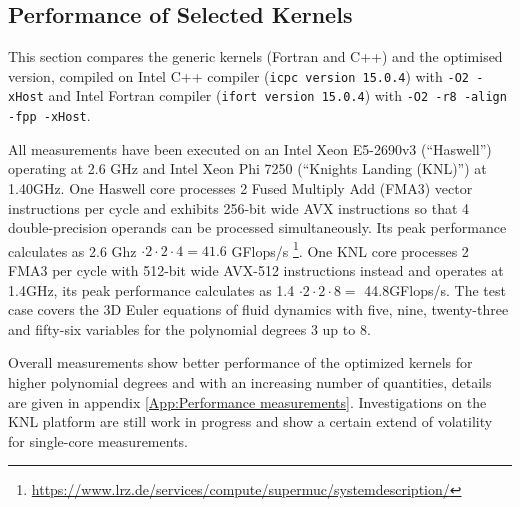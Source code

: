 \documentclass{acm_proc_article-sp}
\begin{document}
\subsection{Performance of Selected Kernels} 
This section compares the generic kernels (Fortran and C++) and the optimised version, compiled on Intel C++ compiler (\texttt{icpc version 15.0.4}) with \texttt{-O2 -xHost} and Intel Fortran compiler (\texttt{ifort version 15.0.4}) with \texttt{-O2 -r8 -align -fpp -xHost}. 

All measurements have been executed on an Intel Xeon E5-2690v3 (``Haswell'') operating at 2.6 GHz and Intel Xeon Phi 7250 (``Knights Landing (KNL)'') at 1.40GHz. One Haswell core processes 2 Fused Multiply Add (FMA3) vector instructions per cycle and exhibits 256-bit wide AVX instructions so that 4 double-precision operands can be processed simultaneously. Its peak performance calculates as 2.6 Ghz $\cdot 2 \cdot 2 \cdot 4 = 41.6$ GFlops/s \footnote{\url{https://www.lrz.de/services/compute/supermuc/systemdescription/}}. One KNL core processes 2 FMA3 per cycle with 512-bit wide AVX-512 instructions instead and operates at 1.4GHz, its peak performance calculates as 1.4 $\cdot 2 \cdot 2 \cdot 8 = $ 44.8GFlops/s. The test case covers the 3D Euler equations of fluid dynamics with five, nine, twenty-three and fifty-six variables for the polynomial degrees 3 up to 8.

Overall measurements show better performance of the optimized kernels for higher polynomial degrees and with an increasing number of quantities, details are given in appendix \ref{App:Performance measurements}. Investigations on the KNL platform are still work in progress and show a certain extend of volatility for single-core measurements.
\end{document}
